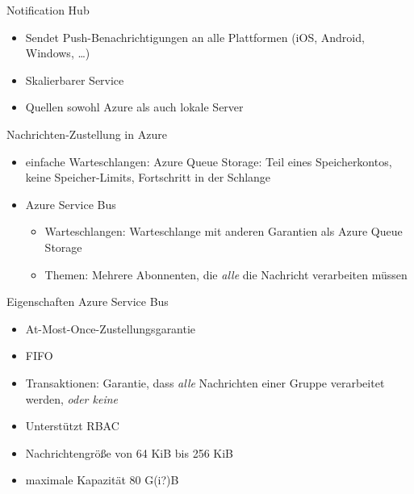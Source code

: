\begin{flashcard}[Definition]{Notification Hub}
    \begin{itemize}
        \item Sendet Push-Benachrichtigungen an alle Plattformen (iOS, Android, Windows, \ldots)
        \item Skalierbarer Service
        \item Quellen sowohl Azure als auch lokale Server
    \end{itemize}
\end{flashcard}

\begin{flashcard}[Definition]{Nachrichten-Zustellung in Azure}
    \begin{itemize}
        \item einfache Warteschlangen: Azure Queue Storage:\newline
            Teil eines Speicherkontos, keine Speicher-Limits, Fortschritt in der Schlange
        \item Azure Service Bus
            \begin{itemize}
                \item Warteschlangen:\newline
                    Warteschlange mit anderen Garantien als Azure Queue Storage
                \item Themen:\newline
                    Mehrere Abonnenten, die \emph{alle} die Nachricht verarbeiten müssen
            \end{itemize}
    \end{itemize}
\end{flashcard}

\begin{flashcard}[Definition]{Eigenschaften Azure Service Bus}
    \begin{itemize}
        \item At-Most-Once-Zustellungsgarantie
        \item FIFO
        \item Transaktionen: Garantie, dass \emph{alle} Nachrichten einer Gruppe verarbeitet werden, \emph{oder keine}
        \item Unterstützt RBAC
        \item Nachrichtengröße von 64 KiB bis 256 KiB
        \item maximale Kapazität 80 G(i?)B
    \end{itemize}
\end{flashcard}

